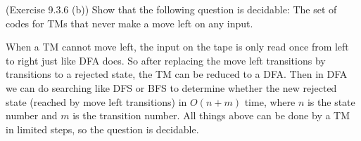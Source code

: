\documentclass[10pt]{homework}
\begin{document}
\begin{solution}
\end{solution}

\begin{problem}
  (Exercise 9.3.6 (b)) Show that the following question is decidable: The set of codes for TMs that never make a move left on any input.
\end{problem}

\begin{solution}
    When a TM cannot move left, the input on the tape is only read once from left to right just like DFA does. So after replacing the move left transitions by transitions to a rejected state, the TM can be reduced to a DFA. Then in DFA we can do searching like DFS or BFS to determine whether the new rejected state (reached by move left transitions) in $O\left( n+m \right) $ time, where $n$ is the state number and $m$ is the transition number. All things above can be done by a TM in limited steps, so the question is decidable.
\end{solution}



\end{document}
